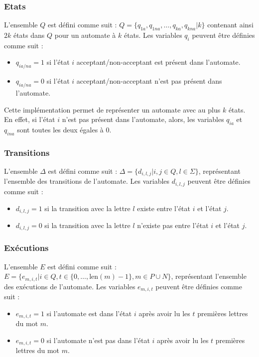 \documentclass[a4paper, 12pt]{extarticle}
\begin{document}
\subsubsection{Etats}
\label{sec:etats}

\noindent L'ensemble $Q$ est défini comme suit : $Q = \{q_{1a}, q_{1na}, \dots, q_{ka}, q_{kna} | k\}$ contenant
ainsi $2k$ états dans $Q$ pour un automate à $k$ états. Les variables $q_i$ peuvent être définies comme suit : 
\begin{itemize}[label=$\bullet$]
    \item $q_{ia/na} = 1$ si l'état $i$ acceptant/non-acceptant est présent dans l'automate.
    \item $q_{ia/na} = 0$ si l'état $i$ acceptant/non-acceptant n'est pas présent dans l'automate.
\end{itemize}
Cette implémentation permet de représenter un automate avec au plus $k$ états. En effet, si l'état $i$ n'est pas présent dans l'automate, 
alors, les variables $q_{ia}$ et $q_{ina}$ sont toutes les deux égales à 0. 


\subsubsection{Transitions} 
\label{sec:transitions} 

\noindent L'ensemble $\Delta$ est défini comme suit : $\Delta = \{d_{i, l, j} | i, j \in Q, l \in \Sigma\}$, représentant
l'ensemble des transitions de l'automate. Les variables $d_{i, l, j}$ peuvent être définies comme suit : 
\begin{itemize}[label=$\bullet$]
    \item $d_{i, l, j} = 1$ si la transition avec la lettre $l$ existe entre l'état $i$ et l'état $j$.
    \item $d_{i, l, j} = 0$ si la transition avec la lettre $l$ n'existe pas entre l'état $i$ et l'état $j$.
\end{itemize} 


\subsubsection{Exécutions}
\label{sec:executions}

\noindent L'ensemble $E$ est défini comme suit : $E = \{e_{m, i, t} | i \in Q, t \in \{0,\dots,\text{len}(m)-1\}, m \in P \cup N\}$,
représentant l'ensemble des exécutions de l'automate. Les variables $e_{m, i, t}$ peuvent être définies comme suit :
\begin{itemize}[label=$\bullet$]
    \item $e_{m, i, t} = 1$ si l'automate est dans l'état $i$ après avoir lu les $t$ premières lettres du mot $m$.
    \item $e_{m, i, t} = 0$ si l'automate n'est pas dans l'état $i$ après avoir lu les $t$ premières lettres du mot $m$.
\end{itemize}
\end{document}
